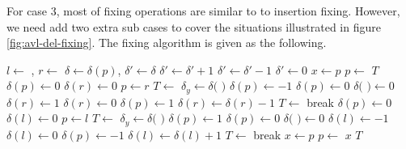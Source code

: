 \documentclass[b5paper]{article}
\begin{document}
For case 3, most of fixing operations are similar to to insertion fixing. However,
we need add two extra sub cases to cover the situations illustrated in figure
\ref{fig:avl-del-fixing}. The fixing algorithm is given as the following.

\begin{algorithmic}[1]
    \State $l \gets$ , $r \gets$ 
    \State $\delta \gets \delta(p)$, $\delta' \gets \delta$
      \State $\delta' \gets \delta' + 1$
    \Else
      \State $\delta' \gets \delta' - 1$
    \EndIf
     
      \State $\delta' \gets 0$
    \EndIf
      \State $x \gets p$
      \State $p \gets$ 
      \State \Return $T$
         
          \State $\delta(p) \gets 0$
          \State $\delta(r) \gets 0$
          \State $p \gets r$
          \State $T \gets $ 
         
          \State $\delta_y \gets \delta($  $)$
            \State $\delta(p) \gets -1$
          \Else
            \State $\delta(p) \gets 0$
          \EndIf
          \State $\delta($  $) \gets 0$
            \State $\delta(r) \gets 1$
          \Else
            \State $\delta(r) \gets 0$
          \EndIf
        \Else {}
          \State $\delta(p) \gets 1$
          \State $\delta(r) \gets \delta(r) - 1$
          \State $T \gets$ 
          \State break 
        \EndIf
         
          \State $\delta(p) \gets 0$
          \State $\delta(l) \gets 0$
          \State $p \gets l$
          \State $T \gets $ 
         
          \State $\delta_y \gets \delta($  $)$
            \State $\delta(p) \gets 1$
          \Else
            \State $\delta(p) \gets 0$
          \EndIf
          \State $\delta($  $) \gets 0$
            \State $\delta(l) \gets -1$
          \Else
            \State $\delta(l) \gets 0$
          \EndIf
        \Else {}
          \State $\delta(p) \gets -1$
          \State $\delta(l) \gets \delta(l) + 1$
          \State $T \gets$ 
          \State break 
        \EndIf
      \EndIf
      \State $x \gets p$
      \State $p \gets$ 
    \EndIf
  \EndWhile
   
    \State \Return $x$
  \EndIf
  \State \Return $T$
\EndFunction
\end{algorithmic}
\end{document}
